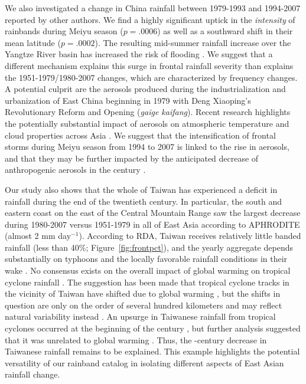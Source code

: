 \documentclass{ametsoc}
\begin{document}
	We also investigated a change in China rainfall between 1979-1993 and 1994-2007 reported by other authors. We find a highly significant uptick in the \textit{intensity} of rainbands during Meiyu season ($p=.0006$) as well as a southward shift in their mean latitude ($p=.0002$). The resulting mid-summer rainfall increase over the Yangtze River basin has increased the risk of flooding \citep{Gemmer2008}. We suggest that a different mechanism explains this surge in frontal rainfall severity than explains the 1951-1979/1980-2007 changes, which are characterized by frequency changes. A potential culprit are the aerosols produced during the industrialization and urbanization of East China beginning in 1979 with Deng Xiaoping's Revolutionary Reform and Opening (\textit{gaige kaifang}). Recent research highlights the potentially substantial impact of aerosols on atmospheric temperature and cloud properties across Asia \citep{Menon2002,Fan2012,Streets2013}. We suggest that the intensification of frontal storms during Meiyu season from 1994 to 2007 is linked to the rise in aerosols, and that they may be further impacted by the anticipated decrease of anthropogenic aerosols in the  century \citep{Westervelt2015}.
		
	Our study also shows that the whole of Taiwan has experienced a deficit in rainfall during the end of the twentieth century. In particular, the south and eastern coast on the east of the Central Mountain Range saw the largest decrease during 1980-2007 versus 1951-1979 in all of East Asia according to APHRODITE (almost 2 mm day$^{-1}$). According to RDA, Taiwan receives relatively little banded rainfall (less than 40\%; Figure~\ref{fig:frontpct}), and the yearly aggregate depends substantially on typhoons and the locally favorable rainfall conditions in their wake \citep{Chen2011}. No consensus exists on the overall impact of global warming on tropical cyclone rainfall \citep{Wehner2015}. The suggestion has been made that tropical cyclone tracks in the vicinity of Taiwan have shifted due to global warming \citep{Wang2011}, but the shifts in question are only on the order of several hundred kilometers and may reflect natural variability instead \citep{Chan2006}. An upsurge in Taiwanese rainfall from tropical cyclones occurred at the beginning of the  century \citep{Tu2009}, but further analysis suggested that it was unrelated to global warming \citep{Chang2013}. Thus, the -century decrease in Taiwanese rainfall remains to be explained. This example highlights the potential versatility of our rainband catalog in isolating different aspects of East Asian rainfall change.
\end{document}
